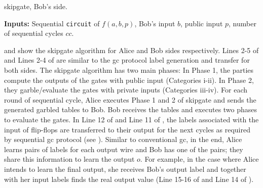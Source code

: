\begin{algorithm}
\caption{\gls{skipgate}, Bob's side.}\label{alg:bob}
\textbf{Inputs:} Sequential \texttt{circuit} of $f(a,b,p)$, Bob's input $b$, public input $p$, number of sequential cycles $cc$.\\
\begin{algorithmic}[1]
\ENDFOR
{}
\end{algorithmic}
\end{algorithm}

 and  show the \gls{skipgate} algorithm for Alice and Bob sides respectively.
Lines 2-5 of  and Lines 2-4 of  are similar to the \acrshort{gc} protocol label generation and transfer for both sides.
The \gls{skipgate} algorithm has two main phases:
In Phase 1, the parties compute the outputs of the gates with public input (Categories i-ii).
In Phase 2, they garble/evaluate the gates with private inputs (Categories iii-iv).
For each round of sequential cycle, Alice executes Phase 1 and 2 of \gls{skipgate} and sends the generated garbled tables to Bob.
Bob receives the tables and executes two phases to evaluate the gates.
In Line 12 of  and Line 11 of , the labels associated with the input of flip-flops are transferred to their output for the next cycles as required by sequential \acrshort{gc} protocol (see ).
Similar to conventional \acrshort{gc}, in the end, Alice learns pairs of labels for each output wire and Bob has one of the pairs; they share this information to learn the output $o$.
For example, in the case where Alice intends to learn the final output, she receives Bob's output label and together with her input labels finds the real output value (Line 15-16 of  and Line 14 of ).

